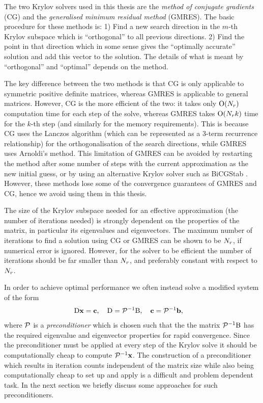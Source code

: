 The two Krylov solvers used in this thesis are the \emph{method of conjugate gradients} (CG) and the \emph{generalised minimum residual method} (GMRES).
The basic procedure for these methods is:
1) Find a new search direction in the $m$-th Krylov subspace which is ``orthogonal'' to all previous directions.
2) Find the point in that direction which in some sense gives the ``optimally accurate'' solution and add this vector to the solution.
The details of what is meant by ``orthogonal'' and ``optimal'' depends on the method.

The key difference between the two methods is that CG is only applicable to symmetric positive definite matrices, whereas GMRES is applicable to general matrices.
However, CG is the more efficient of the two: it takes only $\mathrm{O}{\left( N_r \right)}$ computation time for each step of the solve, whereas GMRES takes $\mathrm{O}{\left( N_r k \right)}$ time for the $k$-th step (and similarly for the memory requirements).
This is because CG uses the Lanczos algorithm (which can be represented as a 3-term recurrence relationship) for the orthogonalisation of the search directions, while GMRES uses Arnoldi's method.
This limitation of GMRES can be avoided by restarting the method after some number of steps with the current approximation as the new initial guess, or by using an alternative Krylov solver such as BiCGStab \cite[172]{HowardElmanDavidSilvester2006}.
However, these methods lose some of the convergence guarantees of GMRES and CG, hence we avoid using them in this thesis.

The size of the Krylov subspace needed for an effective approximation (\ie the number of iterations needed) is strongly dependent on the properties of the matrix, in particular its eigenvalues and eigenvectors.
The maximum number of iterations to find a solution using CG or GMRES can be shown to be $N_r$, if numerical error is ignored.
However, for the solver to be efficient the number of iterations should be far smaller than $N_r$, and preferably constant with respect to $N_r$.

In order to achieve optimal performance we often instead solve a modified system of the form
\begin{equation}
  \begin{aligned}
    \mathrm{D} \boldsymbol{\mathrm{x}} &= {\boldsymbol{\mathrm{c}}}, \quad \mathrm{D} = \mathcal{P}^{-1} \mathrm{B}, \quad {\boldsymbol{\mathrm{c}}} = \mathcal{P}^{-1} {\boldsymbol{\mathrm{b}}},
  \end{aligned}
\end{equation}
where $\mathcal{P}$ is a \emph{preconditioner} which is chosen such that the the matrix $\mathcal{P}^{-1} \mathrm{B}$ has the required eigenvalue and eigenvector properties for rapid convergence.
Since the preconditioner must be applied at every step of the Krylov solve it should be computationally cheap to compute $\mathcal{P}^{-1}\boldsymbol{\mathrm{x}}$.
The construction of a preconditioner which results in iteration counts independent of the matrix size while also being computationally cheap to set up and apply is a difficult and problem dependent task.
In the next section we briefly discuss some approaches for such preconditioners.


